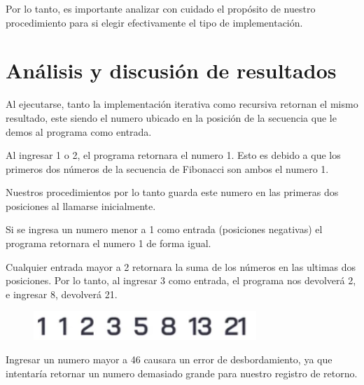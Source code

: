 \documentclass[titlepage]{article}
\begin{document}
Por lo tanto, es importante analizar con cuidado el propósito de nuestro procedimiento para si elegir efectivamente el tipo de implementación.

\section*{Análisis y discusión de resultados}

Al ejecutarse, tanto la implementación iterativa como recursiva retornan el mismo resultado, este siendo el numero ubicado en la posición de la secuencia que le demos al programa como entrada.

Al ingresar 1 o 2, el programa retornara el numero 1. Esto es debido a que los primeros dos números de la secuencia de Fibonacci son ambos el numero 1.

Nuestros procedimientos por lo tanto guarda este numero en las primeras dos posiciones al llamarse inicialmente.

Si se ingresa un numero menor a 1 como entrada (posiciones negativas) el programa retornara el numero 1 de forma igual.

Cualquier entrada mayor a 2 retornara la suma de los números en las ultimas dos posiciones. Por lo tanto, al ingresar 3 como entrada, el programa nos devolverá 2, e ingresar 8, devolverá 21.

\begin{figure}[h]
    \centering
    \includegraphics[width=0.75\textwidth]{images/fibonacci.png} %
    \label{fig:step1}
\end{figure}

Ingresar un numero mayor a 46 causara un error de desbordamiento, ya que intentaría retornar un numero demasiado grande para nuestro registro de retorno.
\end{document}
